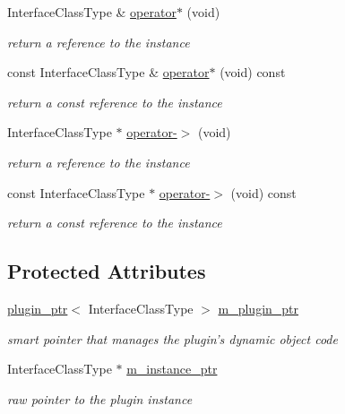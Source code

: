 \begin{DoxyCompactItemize}
Interface\-Class\-Type \& \hyperlink{classpion_1_1plugin__instance__ptr_af1919987100381b912d49144f75c46fe}{operator$\ast$} (void)
\begin{DoxyCompactList}\small\item\em return a reference to the instance \end{DoxyCompactList}\item 
const Interface\-Class\-Type \& \hyperlink{classpion_1_1plugin__instance__ptr_a0ed2270357907c47060b5c0bd14cb6fb}{operator$\ast$} (void) const 
\begin{DoxyCompactList}\small\item\em return a const reference to the instance \end{DoxyCompactList}\item 
Interface\-Class\-Type $\ast$ \hyperlink{classpion_1_1plugin__instance__ptr_a84f65b0841e70a2a6017792d5749390e}{operator-\/$>$} (void)
\begin{DoxyCompactList}\small\item\em return a reference to the instance \end{DoxyCompactList}\item 
const Interface\-Class\-Type $\ast$ \hyperlink{classpion_1_1plugin__instance__ptr_a26b25d3a76f14a22636727ed774eac29}{operator-\/$>$} (void) const 
\begin{DoxyCompactList}\small\item\em return a const reference to the instance \end{DoxyCompactList}\end{DoxyCompactItemize}
\subsection*{Protected Attributes}
\begin{DoxyCompactItemize}
\item 
\hyperlink{classpion_1_1plugin__ptr}{plugin\-\_\-ptr}$<$ Interface\-Class\-Type $>$ \hyperlink{classpion_1_1plugin__instance__ptr_a65856c5fbd856e3c106e3ae708369109}{m\-\_\-plugin\-\_\-ptr}
\begin{DoxyCompactList}\small\item\em smart pointer that manages the plugin's dynamic object code \end{DoxyCompactList}\item 
Interface\-Class\-Type $\ast$ \hyperlink{classpion_1_1plugin__instance__ptr_a414a8f8e915a41caa94aca991cbb775e}{m\-\_\-instance\-\_\-ptr}
\begin{DoxyCompactList}\small\item\em raw pointer to the plugin instance \end{DoxyCompactList}\end{DoxyCompactItemize}



